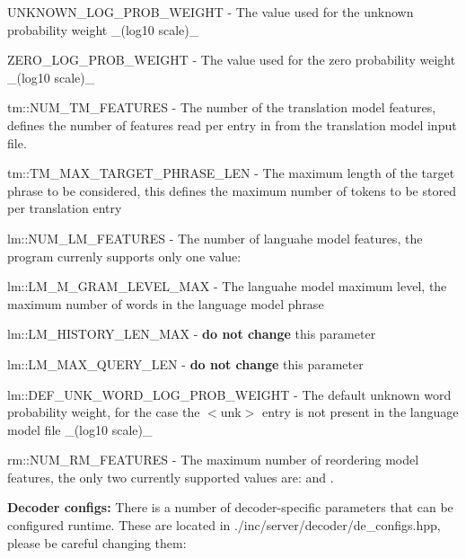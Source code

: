 \begin{DoxyItemize}
\item {\ttfamily U\+N\+K\+N\+O\+W\+N\+\_\+\+L\+O\+G\+\_\+\+P\+R\+O\+B\+\_\+\+W\+E\+I\+G\+H\+T} -\/ The value used for the unknown probability weight \+\_\+(log10 scale)\+\_\+
\item {\ttfamily Z\+E\+R\+O\+\_\+\+L\+O\+G\+\_\+\+P\+R\+O\+B\+\_\+\+W\+E\+I\+G\+H\+T} -\/ The value used for the \textquotesingle{}zero\textquotesingle{} probability weight \+\_\+(log10 scale)\+\_\+
\item {\ttfamily tm\+::\+N\+U\+M\+\_\+\+T\+M\+\_\+\+F\+E\+A\+T\+U\+R\+E\+S} -\/ The number of the translation model features, defines the number of features read per entry in from the translation model input file.
\item {\ttfamily tm\+::\+T\+M\+\_\+\+M\+A\+X\+\_\+\+T\+A\+R\+G\+E\+T\+\_\+\+P\+H\+R\+A\+S\+E\+\_\+\+L\+E\+N} -\/ The maximum length of the target phrase to be considered, this defines the maximum number of tokens to be stored per translation entry
\item {\ttfamily lm\+::\+N\+U\+M\+\_\+\+L\+M\+\_\+\+F\+E\+A\+T\+U\+R\+E\+S} -\/ The number of languahe model features, the program currenly supports only one value\+: {}
\item {\ttfamily lm\+::\+L\+M\+\_\+\+M\+\_\+\+G\+R\+A\+M\+\_\+\+L\+E\+V\+E\+L\+\_\+\+M\+A\+X} -\/ The languahe model maximum level, the maximum number of words in the language model phrase
\item {\ttfamily lm\+::\+L\+M\+\_\+\+H\+I\+S\+T\+O\+R\+Y\+\_\+\+L\+E\+N\+\_\+\+M\+A\+X} -\/ {\bfseries do not change} this parameter
\item {\ttfamily lm\+::\+L\+M\+\_\+\+M\+A\+X\+\_\+\+Q\+U\+E\+R\+Y\+\_\+\+L\+E\+N} -\/ {\bfseries do not change} this parameter
\item {\ttfamily lm\+::\+D\+E\+F\+\_\+\+U\+N\+K\+\_\+\+W\+O\+R\+D\+\_\+\+L\+O\+G\+\_\+\+P\+R\+O\+B\+\_\+\+W\+E\+I\+G\+H\+T} -\/ The default unknown word probability weight, for the case the {\ttfamily $<$unk$>$} entry is not present in the language model file \+\_\+(log10 scale)\+\_\+
\item {\ttfamily rm\+::\+N\+U\+M\+\_\+\+R\+M\+\_\+\+F\+E\+A\+T\+U\+R\+E\+S} -\/ The maximum number of reordering model features, the only two currently supported values are\+: {} and {}.
\end{DoxyItemize}

{\bfseries Decoder configs\+:} There is a number of decoder-\/specific parameters that can be configured runtime. These are located in {\ttfamily ./inc/server/decoder/de\+\_\+configs.hpp}, please be careful changing them\+:


